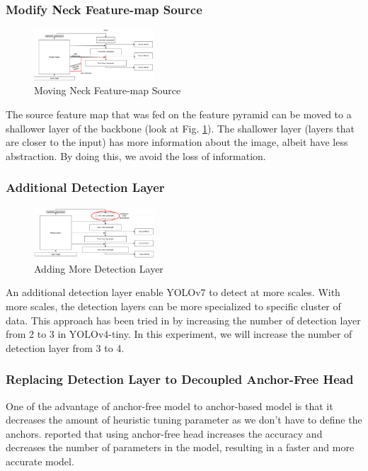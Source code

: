\documentclass[conference]{IEEEtran}
\begin{document}
\subsubsection{Modify Neck Feature-map Source}
\begin{figure}[htbp]
\centerline{\includegraphics[width=0.4\textwidth]{../book/figures/neck-move-back.png}}
\caption{Moving Neck Feature-map Source}
\label{fig:neck-move-back}
\end{figure}
The source feature map that was fed on the feature pyramid can be moved
to a shallower layer of the backbone (look at Fig. \ref{fig:neck-move-back}). 
The shallower layer (layers that are closer to the input) has more 
information about the image, albeit have less abstraction. 
By doing this, we avoid the loss of information.

\subsubsection{Additional Detection Layer}
\begin{figure}[htbp]
\centerline{\includegraphics[width=0.4\textwidth]{../book/figures/add-more-upsampling.png}}
\caption{Adding More Detection Layer}
\label{fig:add-head}
\end{figure}
An additional detection layer enable YOLOv7 to detect at more scales. With more scales,
the detection layers can be more specialized to specific cluster of data.
This approach has been tried in \cite{barunastra} by increasing the number of
detection layer from 2 to 3 in YOLOv4-tiny. In this experiment, we will increase
the number of detection layer from 3 to 4.
\subsubsection{Replacing Detection Layer to Decoupled Anchor-Free Head}
One of the advantage of anchor-free model to anchor-based model
is that it decreases the amount of heuristic tuning parameter as we don't
have to define the anchors. \cite{yolox} reported that using anchor-free
head increases the accuracy and decreases the number of parameters in the model,
resulting in a faster and more accurate model.
\end{document}
